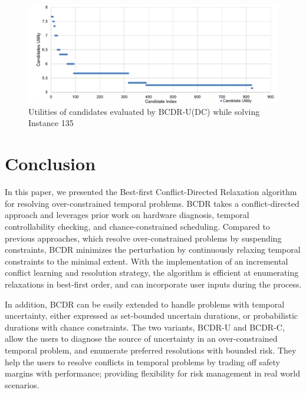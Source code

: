 \documentclass[jair,twoside,11pt,theapa]{article}
\begin{document}


\begin{figure}[htb]
	\centering
	\includegraphics[width=1.0\textwidth]{figures/results/rcpsp_candidate_utility.pdf}
	\caption{Utilities of candidates evaluated by BCDR-U(DC) while solving Instance 135}
	\label{fig:rcpsp_candidate_utilities}
\end{figure}




\section{Conclusion}

In this paper, we presented the Best-first Conflict-Directed Relaxation
algorithm for resolving over-constrained temporal problems. BCDR takes a
conflict-directed approach and leverages prior work on hardware diagnosis,
temporal controllability checking, and chance-constrained scheduling. Compared to
previous approaches, which resolve over-constrained problems by suspending
constraints, BCDR minimizes the perturbation by continuously relaxing temporal
constraints to the minimal extent. With the implementation of an incremental
conflict learning and resolution strategy, the algorithm is efficient at
enumerating relaxations in best-first order, and can incorporate user inputs
during the process. 

In addition, BCDR can be easily extended to handle problems
with temporal uncertainty, either expressed as set-bounded uncertain durations,
or probabilistic durations with chance constraints. The two variants, BCDR-U and
BCDR-C, allow the users to diagnose the source of uncertainty in an
over-constrained temporal problem, and enumerate preferred resolutions with
bounded risk. They help the users to resolve conflicts in temporal problems by
trading off safety margins with performance; providing flexibility for
risk management in real world scenarios. 
\end{document}

